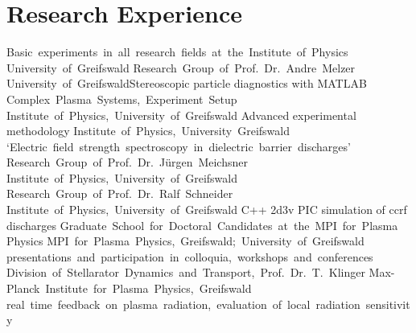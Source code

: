 \documentclass[11pt,a4paper]{moderncv}
\begin{document}
\section{Research Experience}
%
{Basic~experiments~in~all~research~fields~at~the~Institute~of~Physics\newline}{}%
{University~of~Greifswald}{}
%
{Research~Group~of~Prof.~Dr.~Andre~Melzer\newline}{}%
{University~of~Greifswald\newline}{Stereoscopic particle diagnostics with MATLAB}
%
{Complex~Plasma~Systems,~Experiment~Setup\newline}{}%
{Institute~of~Physics,~University~of~Greifswald}{}
%
{Advanced experimental methodology\newline}{}%
{Institute~of~Physics,~University~Greifswald}{}
%
{`Electric~field~strength~spectroscopy~in~dielectric~barrier~discharges'\newline}{}%
{Research~Group~of~Prof.~Dr.~Jürgen~Meichsner\newline}%
{Institute~of~Physics,~University~of~Greifswald}
%
{Research~Group~of~Prof.~Dr.~Ralf~Schneider\newline}{}%
{Institute~of~Physics,~University~of~Greifswald\newline}%
{C++ 2d3v PIC simulation of ccrf discharges}
%
{Graduate~School~for~Doctoral~Candidates~at~the~MPI~for~Plasma Physics\newline}{}%
{MPI~for~Plasma~Physics,~Greifswald;~University~of~Greifswald\newline}%
{presentations~and~participation~in~colloquia,~workshops~and~conferences}
%
{Division~of~Stellarator~Dynamics~and~Transport,~Prof.~Dr.~T.~Klinger\newline}{}%
{Max-Planck~Institute~for~Plasma~Physics,~Greifswald\newline}%
{real~time~feedback~on~plasma~radiation,~evaluation~of~local~radiation~sensitivity}
\end{document}
